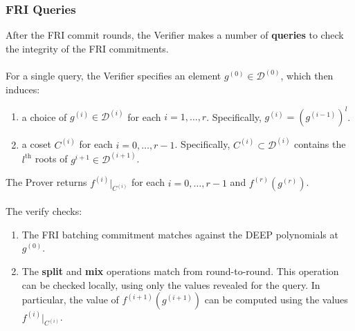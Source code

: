 \documentclass[10pt,letterpaper,titlepage]{article}
\newcommand{\D}[0]{\mathcal{D}}
\theoremstyle{definition}
\begin{document}
\begin{appendices}
\subsubsection*{FRI Queries}
\label{queries}
After the FRI commit rounds, the Verifier makes a number of \textbf{queries} to check the integrity of the FRI commitments. \\
\\
For a single query, the Verifier specifies an element $g^{(0)}\in\D^{(0)}$, which then induces:
\begin{enumerate} 
  \item a choice of $g^{(i)}\in\D^{(i)}$ for each $i=1,\ldots,r$. Specifically, $g^{(i)}=(g^{(i-1)})^l$.
  \item a coset $C^{(i)}$ for each $i=0,\ldots,r-1$. Specifically, $C^{(i)}\subset\D^{(i)}$ contains the $l^\text{th}$ roots of $g^{i+1}\in\D^{(i+1)}$. 
\end{enumerate}
The Prover returns $f^{(i)}|_{C^{(i)}}$ for each $i=0,\ldots,r-1$ and $f^{(r)}(g^{(r)})$. \\
\\
The verify checks:
\begin{enumerate}
  \item The FRI batching commitment matches against the DEEP polynomials at $g^{(0)}$. 
  \item The \textbf{split} and \textbf{mix} operations match from round-to-round. 
  This operation can be checked locally, using only the values revealed for the query. 
  In particular, the value of $f^{(i+1)}(g^{(i+1)})$ can be computed using the values $f^{(i)}|_{C^{(i)}}$.\\
\end{enumerate}


\end{appendices}
\end{document}
